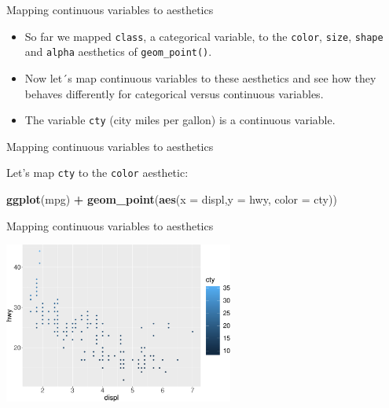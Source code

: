 \documentclass[ignorenonframetext,]{beamer}
\newenvironment{Shaded}{\begin{snugshade}}{\end{snugshade}}
\newcommand{\DataTypeTok}[1]{\textcolor[rgb]{0.13,0.29,0.53}{#1}}
\newcommand{\KeywordTok}[1]{\textcolor[rgb]{0.13,0.29,0.53}{\textbf{#1}}}
\newcommand{\NormalTok}[1]{#1}
\newcommand{\OperatorTok}[1]{\textcolor[rgb]{0.81,0.36,0.00}{\textbf{#1}}}
\newcommand{\StringTok}[1]{\textcolor[rgb]{0.31,0.60,0.02}{#1}}
\begin{document}
\begin{frame}[fragile]{Mapping continuous variables to aesthetics}
\protect\hypertarget{mapping-continuous-variables-to-aesthetics}{}

\begin{itemize}
\item
  So far we mapped \texttt{class}, a categorical variable, to the
  \texttt{color}, \texttt{size}, \texttt{shape} and \texttt{alpha}
  aesthetics of \texttt{geom\_point()}.
\item
  Now let´s map continuous variables to these aesthetics and see how
  they behaves differently for categorical versus continuous variables.
\item
  The variable \texttt{cty} (city miles per gallon) is a continuous
  variable.
\end{itemize}

\end{frame}

\begin{frame}[fragile]{Mapping continuous variables to aesthetics}
\protect\hypertarget{mapping-continuous-variables-to-aesthetics-1}{}

Let's map \texttt{cty} to the \texttt{color} aesthetic:

\begin{Shaded}
\begin{Highlighting}[]
\KeywordTok{ggplot}\NormalTok{(mpg) }\OperatorTok{+}
\StringTok{  }\KeywordTok{geom_point}\NormalTok{(}\KeywordTok{aes}\NormalTok{(}\DataTypeTok{x =}\NormalTok{ displ,}\DataTypeTok{y =}\NormalTok{ hwy, }\DataTypeTok{color =}\NormalTok{ cty))}
\end{Highlighting}
\end{Shaded}

\end{frame}

\begin{frame}{Mapping continuous variables to aesthetics}
\protect\hypertarget{mapping-continuous-variables-to-aesthetics-2}{}

\begin{center}\includegraphics[height=200px]{data-visualization_files/figure-beamer/unnamed-chunk-22-1} \end{center}

\end{frame}
\end{document}
